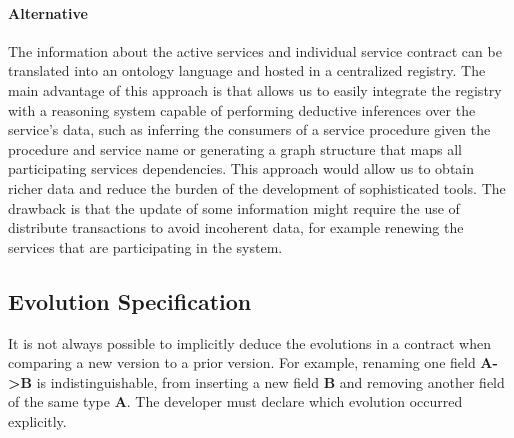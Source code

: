 \paragraph{Alternative}
The information about the active services and individual service contract can be translated into an ontology language and hosted in a centralized registry.
The main advantage of this approach is that allows us to easily integrate the registry with a reasoning system capable of performing deductive inferences over the service's data, such as
inferring the consumers of a service procedure given the procedure and service name or generating a graph structure that maps all participating services dependencies.
This approach would allow us to obtain richer data and reduce the burden of the development of sophisticated tools.
The drawback is that the update of some information might require the use of distribute transactions to avoid incoherent data,
for example renewing the services that are participating in the system.

\subsection{Evolution Specification} %
\label{sec:evolution_specification}

It is not always possible to implicitly deduce the evolutions in a contract when comparing a new version to a prior version.
For example, renaming one field \textbf{A->B} is indistinguishable, from inserting a new field \textbf{B} and removing another field of the same type \textbf{A}.
The developer must declare which evolution occurred explicitly.

